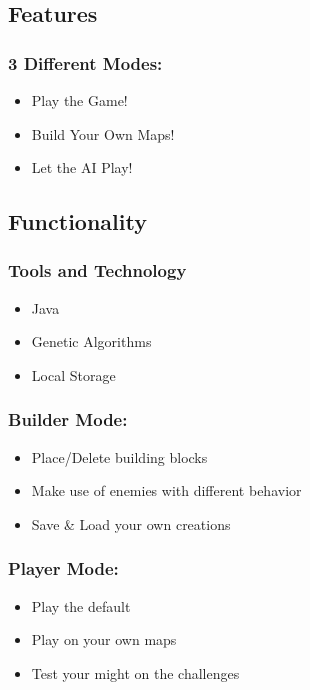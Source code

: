 \documentclass{beamer}
\begin{document}
\subsection{Features}
\begin{frame}
    \frametitle{3 Different Modes:}
    \large
    \begin{itemize}
        \item Play the Game!
        \item Build Your Own Maps!
        \item Let the AI Play!
    \end{itemize}
\end{frame}

\subsection{Functionality}
\begin{frame}
    \frametitle{Tools and Technology}
   \large
    \begin{itemize}
        \item Java 
        \item Genetic Algorithms
        \item Local Storage
    \end{itemize}

\end{frame}

\begin{frame}
    \frametitle{Builder Mode:}    
    \begin{itemize}
        \item Place/Delete building blocks
        \item Make use of enemies with different behavior
        \item Save \& Load your own creations
    \end{itemize}
\end{frame}
\begin{frame}
    \frametitle{Player Mode:}    
    \begin{itemize}
        \item Play the default
        \item Play on your own maps
        \item Test your might on the challenges
    \end{itemize}
\end{frame}
\end{document}
